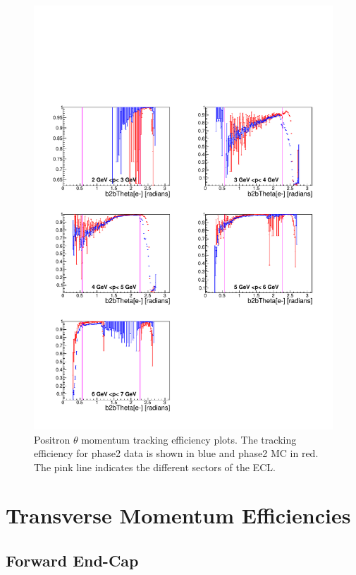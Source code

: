 \documentclass[a4paper,11pt,twosided,final,german,openbib,pdftex,listof=totoc,bibliography=totoc]{scrbook}
\begin{document}
\begin{figure}[!htbp]
	\centering
	\includegraphics[width=\textwidth]{Plots/master/xPMThetaep}
	\caption[Momentum $\theta$ Positron Efficiency Phase2]{Positron $\theta$ momentum tracking efficiency plots. The tracking efficiency for phase2 data is shown in blue and phase2 MC in red. The pink line indicates the different sectors of the ECL.}
	\label{plt:xPMThetaep}
\end{figure}

\clearpage

\section{Transverse Momentum Efficiencies}

\subsection{Forward End-Cap}
\end{document}
